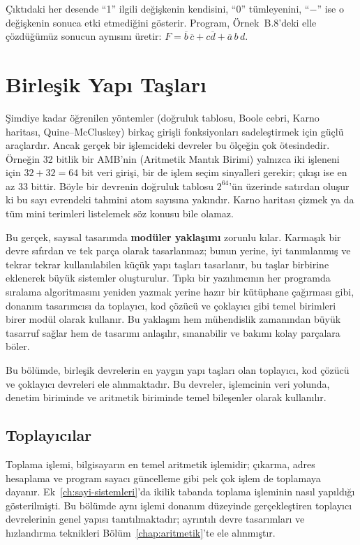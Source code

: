 \noindent Çıktıdaki her desende ``1'' ilgili değişkenin kendisini, ``0'' tümleyenini, ``$-$'' ise o değişkenin sonuca etki etmediğini gösterir. Program, Örnek~B.8'deki elle çözdüğümüz sonucun aynısını üretir: $F = \overline{b}\,\overline{c} + c\overline{d} + \overline{a}\,b\,d$.


\section{Birleşik Yapı Taşları}

Şimdiye kadar öğrenilen yöntemler (doğruluk tablosu, Boole cebri, Karno haritası, Quine--McCluskey) birkaç girişli fonksiyonları sadeleştirmek için güçlü araçlardır. Ancak gerçek bir işlemcideki devreler bu ölçeğin çok ötesindedir. Örneğin 32 bitlik bir AMB'nin (Aritmetik Mantık Birimi) yalnızca iki işleneni için $32 + 32 = 64$ bit veri girişi, bir de işlem seçim sinyalleri gerekir; çıkışı ise en az 33 bittir. Böyle bir devrenin doğruluk tablosu $2^{64}$'ün üzerinde satırdan oluşur ki bu sayı evrendeki tahmini atom sayısına yakındır. Karno haritası çizmek ya da tüm mini terimleri listelemek söz konusu bile olamaz.

Bu gerçek, sayısal tasarımda \textbf{modüler yaklaşımı} zorunlu kılar. Karmaşık bir devre sıfırdan ve tek parça olarak tasarlanmaz; bunun yerine, iyi tanımlanmış ve tekrar tekrar kullanılabilen küçük yapı taşları tasarlanır, bu taşlar birbirine eklenerek büyük sistemler oluşturulur. Tıpkı bir yazılımcının her programda sıralama algoritmasını yeniden yazmak yerine hazır bir kütüphane çağırması gibi, donanım tasarımcısı da toplayıcı, kod çözücü ve çoklayıcı gibi temel birimleri birer modül olarak kullanır. Bu yaklaşım hem mühendislik zamanından büyük tasarruf sağlar hem de tasarımı anlaşılır, sınanabilir ve bakımı kolay parçalara böler.

Bu bölümde, birleşik devrelerin en yaygın yapı taşları olan toplayıcı, kod çözücü ve çoklayıcı devreleri ele alınmaktadır. Bu devreler, işlemcinin veri yolunda, denetim biriminde ve aritmetik biriminde temel bileşenler olarak kullanılır.

\subsection{Toplayıcılar}
\label{sec:toplayicilar}

Toplama işlemi, bilgisayarın en temel aritmetik işlemidir; çıkarma, adres hesaplama ve program sayacı güncelleme gibi pek çok işlem de toplamaya dayanır. Ek~\ref{ch:sayi-sistemleri}'da ikilik tabanda toplama işleminin nasıl yapıldığı gösterilmişti. Bu bölümde aynı işlemi donanım düzeyinde gerçekleştiren toplayıcı devrelerinin genel yapısı tanıtılmaktadır; ayrıntılı devre tasarımları ve hızlandırma teknikleri Bölüm~\ref{chap:aritmetik}'te ele alınmıştır.

